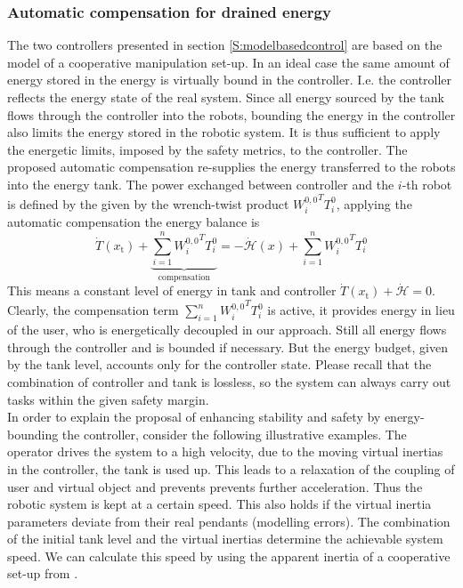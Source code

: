 \documentclass[a4paper,twoside, openright,12pt]{report}
\newcommand{\g}[1]{\text{#1}}
\begin{document}
{\subsubsection{Automatic compensation for drained energy}
The two controllers presented in section \ref{S:modelbasedcontrol} are based on the model of a cooperative manipulation set-up. In an ideal case the same amount of energy stored in the energy is virtually bound in the controller. I.e. the controller reflects the energy state of the real system. Since all energy sourced by the tank flows through the controller into the robots, bounding the energy in the controller also limits the energy stored in the robotic system.
It is thus sufficient to apply the energetic limits, imposed by the safety metrics, to the controller. The proposed automatic compensation re-supplies the energy transferred to the robots into the energy tank. 
The power exchanged between controller and the $i$-th robot is defined by the given by the wrench-twist product ${W_i^{0,0}}^T T_i^0$, applying the automatic compensation the energy balance is
\begin{equation}
\dot{T}(x_\g{t}) + \underbrace{\sum_{i=1}^n {W_i^{0,0}}^T T_i^0}_{\text{compensation}} = - \dot{{\mathcal{H}}}(x) + \sum_{i=1}^n {W_i^{0,0}}^T T_i^0
\end{equation}
This means a constant level of energy in tank and controller $\dot{T}(x_\g{t})+\dot{\mathcal{H}} = 0$.
Clearly, the compensation term $\sum_{i=1}^n {W_i^{0,0}}^T T_i^0$ is active, it provides energy in lieu of the user, who is energetically decoupled in our approach. Still all energy flows through the controller and is bounded if necessary. But the energy budget, given by the tank level, accounts only for the controller state. Please recall that the combination of controller and tank is lossless, so the system can always carry out tasks within the given safety margin.\\ 
In order to explain the proposal of enhancing stability and safety by energy-bounding the controller, consider the following illustrative examples.
The operator drives the system to a high velocity, due to the moving virtual inertias in the controller, the tank is used up. This leads to a relaxation of the coupling of user and virtual object and prevents prevents further acceleration. Thus the robotic system is kept at a certain speed. This also holds if the virtual inertia parameters deviate from their real pendants (modelling errors). The combination of the initial tank level and the virtual inertias determine the achievable system speed. We can calculate this speed by using the apparent inertia of a cooperative set-up from \cite{Erhart_16}.\\ 
}
\end{document}
